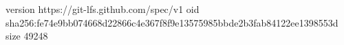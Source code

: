 version https://git-lfs.github.com/spec/v1
oid sha256:fe74e9bb074668d22866c4e367f8f9e13575985bbde2b3fab84122ee1398553d
size 49248
